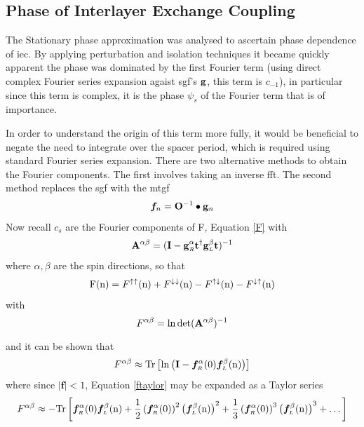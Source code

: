 \documentclass[a4paper, 12pt]{article}
\begin{document}
\subsection{Phase of Interlayer Exchange Coupling}
\par The Stationary phase approximation was analysed to ascertain phase dependence of \gls{iec}.
By applying perturbation and isolation techniques it became quickly apparent the phase was dominated by the first Fourier term (using direct complex Fourier series expansion agaist \gls{sgf}'s $\bf g$, this term is $c_{-1}$), in particular since this term is complex, it is the phase $\psi_s$ of the Fourier term that is of importance.
\par In order to understand the origin of this term more fully, it would be beneficial to negate the need to integrate over the spacer period, which is required using standard Fourier series expansion.
There are two alternative methods to obtain the Fourier components. The first involves taking an inverse \gls{fft}.
The second method replaces the \gls{sgf} with the \gls{mtgf} 
\begin{equation}\label{fn}
	\bm f_n = {\bf O}^{-1}\bullet {\bf g}_n
\end{equation}
Now recall $c_s$ are the Fourier components of F, Equation \eqref{F} with
\begin{equation}
	{\bf A}^{\alpha\beta} = ({\bf I - g}_{\scriptscriptstyle R}^{\alpha}{\bf t}^\dag {\bf g}_{\scriptscriptstyle L}^{\beta}{\bf t})^{-1}
\end{equation}
where $\alpha, \beta$ are the spin directions, so that
\begin{equation}
	{\rm F(n)} = F^{\uparrow\uparrow}({\rm n})+F^{\downarrow\downarrow}({\rm n}) - F^{\uparrow\downarrow}({\rm n})-F^{\downarrow\uparrow}({\rm n})
\end{equation}
with
\begin{equation}
	F^{\alpha\beta} = \ln\det({\bf A}^{\alpha\beta})^{-1}
\end{equation}
and it can be shown that\textsuperscript{\textcolor{blue}{\cite{com}}}
\begin{equation}\label{ftaylor}
	F^{\alpha\beta} \approx {\rm Tr}\left[\ln\left({\bf I}-\bm f_{\scriptscriptstyle R}^{\alpha}(0)\bm f_{\scriptscriptstyle L}^{\beta}({\rm n})\right)\right]
\end{equation}
where since $|\bm f| <1$, Equation \eqref{ftaylor} may be expanded as a Taylor series
\begin{equation}\label{fourierf}
	F^{\alpha\beta} \approx -{\rm Tr}\left[\bm f_{\scriptscriptstyle R}^{\alpha}(0) \bm f_{\scriptscriptstyle L}^{\beta}({\rm n})+\frac{1}{2}\left(\bm f_{\scriptscriptstyle R}^{\alpha}(0)\right)^2 \left(\bm f_{\scriptscriptstyle L}^{\beta}({\rm n})\right)^2+\frac{1}{3}\left(\bm f_{\scriptscriptstyle R}^{\alpha}(0)\right)^3 \left(\bm f_{\scriptscriptstyle L}^{\beta}({\rm n})\right)^3+\dots\right]
\end{equation}
\end{document}
